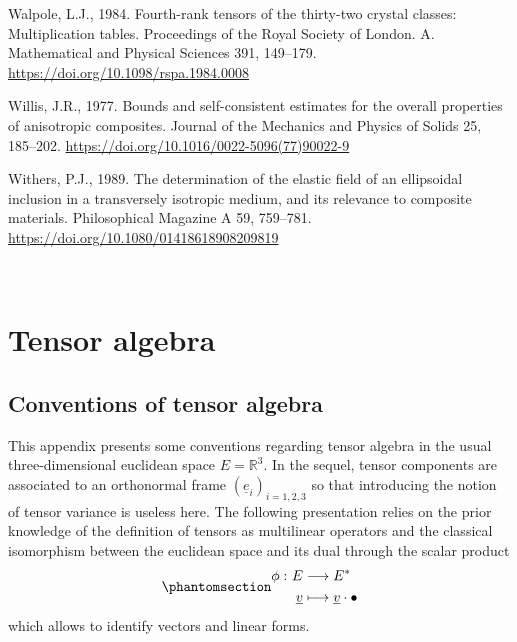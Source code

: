 \documentclass[
  a4paper,
  numbers=noendperiod,
  DIV=12]{scrreprt}
\newlength{\cslhangindent}
\newenvironment{CSLReferences}[2] %
 {\begin{list}{}{%
  \setlength{\itemindent}{0pt}
  \setlength{\leftmargin}{0pt}
  \setlength{\parsep}{0pt}
  \ifodd #1
   \setlength{\leftmargin}{\cslhangindent}
   \setlength{\itemindent}{-1\cslhangindent}
  \fi
  \setlength{\itemsep}{#2\baselineskip}}}
 {\end{list}}
\newcommand{\R}{{\mathbb{{R}}}}
\newcommand{\uv}[1]{{\underline{{#1}}}}
\newcommand{\ve}[1]{{\uv{{e}}_{{#1}}}}
\begin{document}
\begin{CSLReferences}{1}{0}
Walpole, L.J., 1984. Fourth-rank tensors of the thirty-two crystal
classes: Multiplication tables. Proceedings of the Royal Society of
London. A. Mathematical and Physical Sciences 391, 149--179.
\url{https://doi.org/10.1098/rspa.1984.0008}

Willis, J.R., 1977. Bounds and self-consistent estimates for the overall
properties of anisotropic composites. Journal of the Mechanics and
Physics of Solids 25, 185--202.
\url{https://doi.org/10.1016/0022-5096(77)90022-9}

Withers, P.J., 1989. The determination of the elastic field of an
ellipsoidal inclusion in a transversely isotropic medium, and its
relevance to composite materials. Philosophical Magazine A 59, 759--781.
\url{https://doi.org/10.1080/01418618908209819}

\end{CSLReferences}

\(\,\)

\cleardoublepage
{}
{}
\appendix

\chapter{Tensor algebra}\label{sec-tensor_algebra}

\section{Conventions of tensor
algebra}\label{sec-tensoralgebra_convention}

This appendix presents some conventions regarding tensor algebra in the
usual three-dimensional euclidean space \(E=\R^3\). In the sequel,
tensor components are associated to an orthonormal frame
\((\ve{i})_{i=1,2,3}\) so that introducing the notion of tensor variance
is useless here. The following presentation relies on the prior
knowledge of the definition of tensors as multilinear operators and the
classical isomorphism between the euclidean space and its dual through
the scalar product
\begin{equation}\phantomsection\label{eq-scalarprod}{\begin{aligned}
\phi\,\colon E & \longrightarrow  E^* \\
       \uv{v} & \longmapsto \uv{v}\cdot\bullet
\end{aligned}}\end{equation} which allows to identify vectors and linear
forms.
\end{document}

